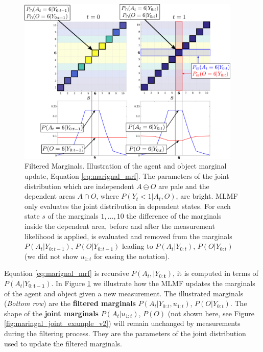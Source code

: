\begin{figure}
\centering
\includegraphics[width=0.95\textwidth]{./ch5-MLMF/Figures/explenation/marginal_cal_example.pdf}
\caption{Filtered Marginals. Illustration of the agent and object marginal update, Equation \ref{eq:marignal_mrf}. The parameters of the joint 
distribution which are independent $A \ominus O$ are pale and the dependent areas $A \cap O$, where $P(Y_t<1|A_t,O)$, are bright. MLMF only
evaluates the joint distribution in dependent states. For each state $s$ of the marginals $1,\dots,10$ the difference 
of the marginals inside the dependent area, before and after the measurement likelihood is applied, is evaluated and removed from the marginals 
$P(A_t|Y_{0:t-1})$, $P(O|Y_{0:t-1})$ leading to $P(A_t|Y_{0:t})$, $P(O|Y_{0:t})$ (we did not show $u_{1:t}$ for easing the notation). }
\label{fig:ch5:marginal_update}
\end{figure}

Equation \ref{eq:marignal_mrf} is recursive $P(A_t,|Y_{0:\mathbf{t}})$, it is computed in terms of $P(A_t|Y_{0:\mathbf{t-1}})$. In 
Figure \ref{fig:ch5:marginal_update} we illustrate how the MLMF updates the marginals of the agent and object given a new measurement.
The illustrated marginals (\textit{Bottom row}) are the \textbf{filtered marginals} $P(A_t|Y_{0:t},u_{1:t})$, $P(O|Y_{0:t})$. The shape of the \textbf{joint marginals} $P(A_t|u_{1:t})$, $P(O)$
(not shown here, see Figure \ref{fig:maringal_joint_example_v2}) will remain unchanged by measurements during the filtering process. They are the parameters of the joint distribution used to 
update the filtered marginals.

